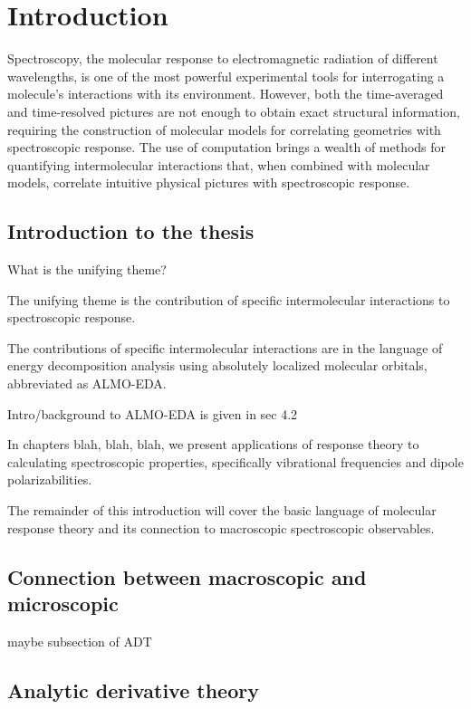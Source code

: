 \documentclass[%
class = book,%
crop = false,%
float = true,%
multi = true,%
preview = false,%
]{standalone}
\begin{document}
\chapter{Introduction}
\label{ch:introduction}

Spectroscopy, the molecular response to electromagnetic radiation of different wavelengths, is one of the most powerful experimental tools for interrogating a molecule's interactions with its environment. However, both the time-averaged and time-resolved pictures are not enough to obtain exact structural information, requiring the construction of molecular models for correlating geometries with spectroscopic response. The use of computation brings a wealth of methods for quantifying intermolecular interactions that, when combined with molecular models, correlate intuitive physical pictures with spectroscopic response.

\section{Introduction to the thesis}
What is the unifying theme?

The unifying theme is the contribution of specific intermolecular interactions to spectroscopic response.

The contributions of specific intermolecular interactions are in the language of energy decomposition analysis using absolutely localized molecular orbitals, abbreviated as ALMO-EDA.

Intro/background to ALMO-EDA is given in sec 4.2

In chapters blah, blah, blah, we present applications of response theory to calculating spectroscopic properties, specifically vibrational frequencies and dipole polarizabilities.

The remainder of this introduction will cover the basic language of molecular response theory and its connection to macroscopic spectroscopic observables.

\section{Connection between macroscopic and microscopic}

maybe subsection of ADT

\section{Analytic derivative theory}
\end{document}
